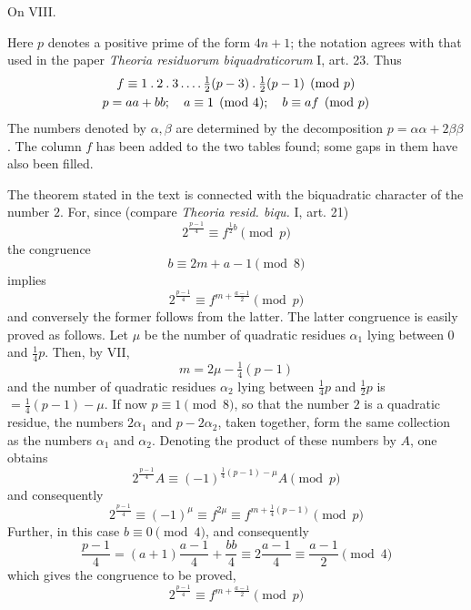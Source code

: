 \begin{center}\large On VIII.\end{center}

Here $p$ denotes a positive prime of the form $4n+1$; the notation agrees with that used in the paper \emph{Theoria residuorum biquadraticorum} I, art. 23. Thus
\[
\begin{gathered}
f\equiv1\mathbin{.}2\mathbin{.}3\mathinner{.\,.\,.\,.}\tfrac12(p-3)\mathbin{.}\tfrac12(p-1)\pmod p\\
p=aa+bb;\quad a\equiv1\pmod4;\quad b\equiv af\pmod p
\end{gathered}
\]
The numbers denoted by $\alpha,\beta$ are determined by the decomposition $p=\alpha\alpha+2\beta\beta$. The column $f$ has been added to the two tables found; some gaps in them have also been filled.

The theorem stated in the text is connected with the biquadratic character of the number $2$. For, since (compare \emph{Theoria resid. biqu.} I, art. 21)
\[
2^{\frac{p-1}4}\equiv f^{\frac12 b}\pmod p
\]
the congruence
\[
b\equiv2m+a-1\pmod8
\]
implies
\[
2^{\frac{p-1}4}\equiv f^{m+\frac{a-1}2}\pmod p
\]
and conversely the former follows from the latter. The latter congruence is easily proved as follows. Let $\mu$ be the number of quadratic residues $\alpha_1$ lying between $0$ and $\frac14p$. Then, by VII,
\[
m=2\mu-\tfrac14(p-1)
\]
and the number of quadratic residues $\alpha_2$ lying between $\frac14p$ and $\frac12p$ is $=\frac14(p-1)-\mu$. If now $p\equiv1\pmod8$, so that the number $2$ is a quadratic residue, the numbers $2\alpha_1$ and $p-2\alpha_2$, taken together, form the same collection as the numbers $\alpha_1$ and $\alpha_2$. Denoting the product of these numbers by $A$, one obtains
\[
2^{\frac{p-1}4}A\equiv(-1)^{\frac14(p-1)-\mu}A\pmod p
\]
and consequently
\[
2^{\frac{p-1}4}\equiv(-1)^\mu\equiv f^{2\mu}\equiv f^{m+\frac14(p-1)}\pmod p
\]
Further, in this case $b\equiv0\pmod4$, and consequently
\[
\frac{p-1}4=(a+1)\frac{a-1}4+\frac{bb}4\equiv2\frac{a-1}4\equiv\frac{a-1}2\pmod4
\]
which gives the congruence to be proved,
\[
2^{\frac{p-1}4}\equiv f^{m+\frac{a-1}2}\pmod p
\]

